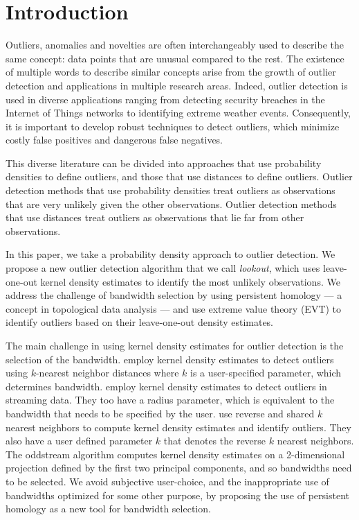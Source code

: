 \documentclass[12pt]{article}
\theoremstyle{definition}
\theoremstyle{definition}
\theoremstyle{definition}
\theoremstyle{definition}
\theoremstyle{remark}
\begin{document}
\hypertarget{introduction}{%
\section{Introduction}\label{introduction}}

Outliers, anomalies and novelties are often interchangeably used to describe the same concept: data points that are unusual compared to the rest. The existence of multiple words to describe similar concepts arise from the growth of outlier detection and applications in multiple research areas. Indeed, outlier detection is used in diverse applications ranging from detecting security breaches in the Internet of Things networks to identifying extreme weather events. Consequently, it is important to develop robust techniques to detect outliers, which minimize costly false positives and dangerous false negatives.

This diverse literature can be divided into approaches that use probability densities to define outliers, and those that use distances to define outliers. Outlier detection methods that use probability densities treat outliers as observations that are very unlikely given the other observations. Outlier detection methods that use distances treat outliers as observations that lie far from other observations.

In this paper, we take a probability density approach to outlier detection. We propose a new outlier detection algorithm that we call \emph{lookout}, which uses leave-one-out kernel density estimates to identify the most unlikely observations. We address the challenge of bandwidth selection by using persistent homology --- a concept in topological data analysis --- and use extreme value theory (EVT) to identify outliers based on their leave-one-out density estimates.

The main challenge in using kernel density estimates for outlier detection is the selection of the bandwidth. \citet{Schubert2014} employ kernel density estimates to detect outliers using \(k\)-nearest neighbor distances where \(k\) is a user-specified parameter, which determines bandwidth. \citet{Qin2019} employ kernel density estimates to detect outliers in streaming data. They too have a radius parameter, which is equivalent to the bandwidth that needs to be specified by the user. \citet{Tang2017} use reverse and shared \(k\) nearest neighbors to compute kernel density estimates and identify outliers. They also have a user defined parameter \(k\) that denotes the reverse \(k\) nearest neighbors. The oddstream algorithm \citep{talagala2019anomaly} computes kernel density estimates on a 2-dimensional projection defined by the first two principal components, and so bandwidths need to be selected. We avoid subjective user-choice, and the inappropriate use of bandwidths optimized for some other purpose, by proposing the use of persistent homology as a new tool for bandwidth selection.
\end{document}
